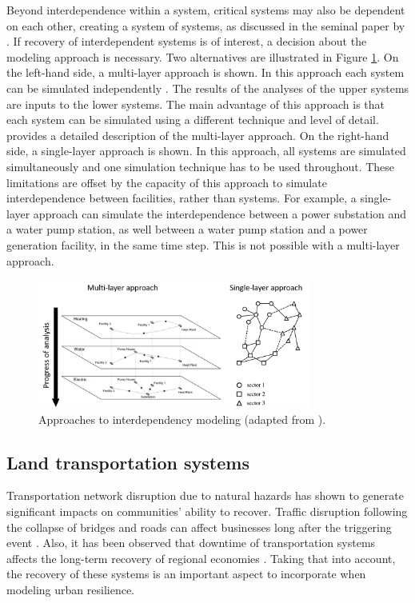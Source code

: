 Beyond interdependence within a system, critical systems may also be dependent on each other, creating a system of systems, as discussed in the seminal paper by \cite{rinaldi2001identifying}. If recovery of interdependent systems is of interest, a decision about the modeling approach is necessary. Two alternatives are illustrated in Figure \ref{fig:Interdependencies}. On the left-hand side, a multi-layer approach is shown. In this approach each system can be simulated independently \citep{guidotti2017multi}. The results of the analyses of the upper systems are inputs to the lower systems. The main advantage of this approach is that each system can be simulated using a different technique and level of detail. \cite[p.243]{cimellaro2016resilience} provides a detailed description of the multi-layer approach. On the right-hand side, a single-layer approach is shown. In this approach, all systems are simulated simultaneously and one simulation technique has to be used throughout. These limitations are offset by the capacity of this approach to simulate interdependence between facilities, rather than systems. For example, a single-layer approach can simulate the interdependence between a power substation and a water pump station, as well between a water pump station and a power generation facility, in the same time step. This is not possible with a multi-layer approach.\ 

\begin{figure}[htb]
    \centering
    \includegraphics[width=0.8\textwidth, angle = 0]{Figures/Interdependencies.png}
    \caption{Approaches to interdependency modeling (adapted from \cite{cimellaro2016resilience}).}
    \label{fig:Interdependencies}
\end{figure}

\subsection{Land transportation systems}
Transportation network disruption due to natural hazards has shown to generate significant impacts on communities' ability to recover. Traffic disruption following the collapse of bridges and roads can affect businesses long after the triggering event \citep{boarnet1998business}. Also, it has been observed that downtime of transportation systems affects the long-term recovery of regional economies \citep{chang2000transportation}. Taking that into account, the recovery of these systems is an important aspect to incorporate when modeling urban resilience. \

